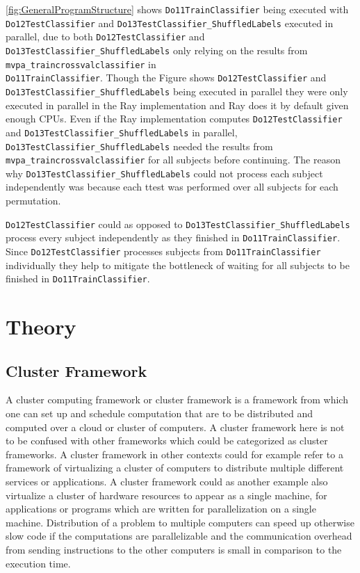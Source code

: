 \documentclass[12pt, a4paper]{article}
\begin{document}
\cref{fig:GeneralProgramStructure} shows \texttt{Do11TrainClassifier} being executed with \texttt{Do12TestClassifier} and \texttt{Do13TestClassifier\_ShuffledLabels} executed in parallel, due to both \texttt{Do12TestClassifier} and \texttt{Do13TestClassifier\_ShuffledLabels} only relying on the results from \texttt{mvpa\_traincrossvalclassifier} in\\
\texttt{Do11TrainClassifier}.
Though the Figure shows \texttt{Do12TestClassifier} and \texttt{Do13TestClassifier\_ShuffledLabels} being executed in parallel they were only executed in parallel in the Ray implementation and Ray does it by default given enough CPUs.
Even if the Ray implementation computes \texttt{Do12TestClassifier} and \texttt{Do13TestClassifier\_ShuffledLabels} in parallel, \texttt{Do13TestClassifier\_ShuffledLabels} needed the results from \texttt{mvpa\_traincrossvalclassifier} for all subjects before continuing.
The reason why \texttt{Do13TestClassifier\_ShuffledLabels} could not process each subject independently was because each ttest was performed over all subjects for each permutation.

\texttt{Do12TestClassifier} could as opposed to \texttt{Do13TestClassifier\_ShuffledLabels} process every subject independently as they finished in \texttt{Do11TrainClassifier}.
Since \texttt{Do12TestClassifier} processes subjects from \texttt{Do11TrainClassifier} individually they help to mitigate the bottleneck of waiting for all subjects to be finished in \texttt{Do11TrainClassifier}.
 

\section{Theory}

\subsection{Cluster Framework}

A cluster computing framework or cluster framework is a framework from which one can set up and schedule computation that are to be distributed and computed over a cloud or cluster of computers.
A cluster framework here is not to be confused with other frameworks which could be categorized as cluster frameworks.
A cluster framework in other contexts could for example  refer to a framework of virtualizing a cluster of computers to distribute multiple different services or applications.
A cluster framework could as another example also virtualize a cluster of hardware resources to appear as a single machine, for applications or programs which are written for parallelization on a single machine.
Distribution of a problem to multiple computers can speed up otherwise slow code if the computations are parallelizable and the communication overhead from sending instructions to the other computers is small in comparison to the execution time.
\end{document}

